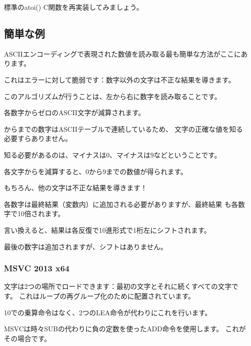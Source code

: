 

標準のatoi() C関数を再実装してみましょう。

\subsection{簡単な例}

\ac{ASCII}エンコーディングで表現された数値を読み取る最も簡単な方法がここにあります。

これはエラーに対して脆弱です：数字以外の文字は不正な結果を導きます。



このアルゴリズムが行うことは、左から右に数字を読み取ることです。

各数字からゼロの\ac{ASCII}文字が減算されます。

からまでの数字は\ac{ASCII}テーブルで連続しているため、
文字の正確な値を知る必要すらありません。

知る必要があるのは、マイナスは0、マイナスは9などということです。

各文字からを減算すると、0から9までの数値が得られます。

もちろん、他の文字は不正な結果を導きます！

各数字は最終結果（変数内）に追加される必要がありますが、最終結果
も各数字で10倍されます。

言い換えると、結果は各反復で10進形式で1桁左にシフトされます。

最後の数字は追加されますが、シフトはありません。

\subsubsection{\Optimizing MSVC 2013 x64}



文字は2つの場所でロードできます：最初の文字とそれに続くすべての文字です。
これはループの再グループ化のために配置されています。

10での乗算命令はなく、2つのLEA命令が代わりにこれを行います。

MSVCは時々SUBの代わりに負の定数を使ったADD命令を使用します。
これがその場合です。

